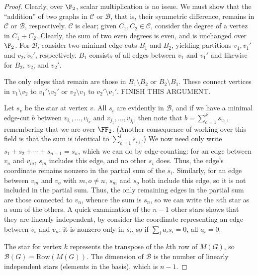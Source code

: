 \documentclass[11pt,letterpaper]{article}
\begin{document}
\begin{proof}
    Clearly, over $\F_2$, scalar multiplication is no issue. We must show that the ``addition'' of two graphs in $\mathcal{C}$ or $\mathcal{B}$, that is, their symmetric difference, remains in $\mathcal{C}$ or $\mathcal{B}$, respectively. $\mathcal{C}$ is clear; given $C_1,C_2\in\mathcal{C}$, consider the degree of a vertez in $C_1+C_2$. Clearly, the sum of two even degrees is even, and is unchanged over $\F_2$. For $\mathcal{B}$, consider two minimal edge cuts $B_1$ and $B_2$, yielding partitions $v_1, v_1'$ and $v_2, v_2'$, respectively. $B_1$ consists of all edges between $v_1$ and $v_1'$ and likewise for $B_2$, $v_2$, and $v_2'$.

    The only edges that remain are those in $B_1\setminus B_2$ or $B_2\setminus B_1$. These connect vertices in $v_1\setminus v_2$ to $v_1'\setminus v_2'$ or $v_2\setminus v_1$ to $v_2'\setminus v_1'$.
    FINISH THIS ARGUMENT.
    
    Let $s_v$ be the star at vertex $v$. All $s_i$ are evidently in $\mathcal{B}$, and if we have a minimal edge-cut $b$ between $v_{i_1},\dots,v_{i_k}$ and $v_{j_1},\dots,v_{j_l}$, then note that $b=\sum_{c=1}^k s_{v_{i_c}}$, remembering that we are over $\FF_2$. (Another consequence of working over this field is that the sum is identical to $\sum_{c=1}^ls_{v_{j_c}}$.) We now need only write $s_1+s_2+\cdots+s_{n-1}=s_n$, which we can do by edge-counting: for an edge between $v_n$ and $v_m$, $s_m$ includes this edge, and no other $s_i$ does. Thus, the edge's coordinate remains nonzero in the partial sum of the $s_i$. Similarly, for an edge between $v_m$ and $v_o$ with $m,o\neq n$, $s_m$ and $s_o$ both include this edge, so it is not included in the partial sum. Thus, the only remaining edges in the partial sum are those connected to $v_n$, whence the sum is $s_n$, so we can write the $n$th star as a sum of the others. A quick examination of the $n-1$ other stars shows that they are linearly independent, by consider the coordinate representing an edge between $v_i$ and $v_n$: it is nonzero only in $s_i$, so if $\sum_{i}a_is_i=0$, all $a_i=0$.

    The star for vertex $k$ represents the transpose of the $k$th row of $M(G)$, so $\mathcal{B}(G)=\text{Row}(M(G))$. The dimension of $\mathcal{B}$ is the number of linearly independent stars (elements in the basis), which is $n-1$.

    
\end{proof}
\end{document}
